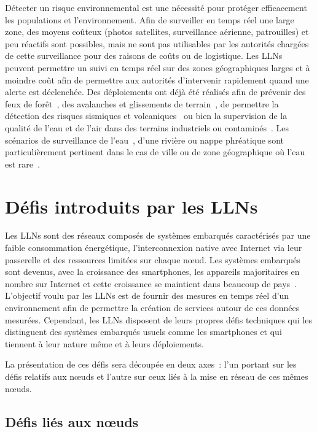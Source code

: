 Détecter un risque environnemental est une nécessité pour protéger efficacement les populations et l'environnement.
Afin de surveiller en temps réel une large zone, des moyens coûteux (photos satellites, surveillance aérienne, patrouilles) et peu réactifs sont possibles, mais ne sont pas utilisables par les autorités chargées de cette surveillance pour des raisons de coûts ou de logistique.
Les \ac{LLN}s peuvent permettre un suivi en temps réel sur des zones géographiques larges et à moindre coût afin de permettre aux autorités d'intervenir rapidement quand une alerte est déclenchée.
Des déploiements ont déjà été réalisés afin de prévenir des feux de forêt~\cite{yu2005real}, des avalanches et glissements de terrain~\cite{terzis2006slip, alippi2007adaptive}, de permettre la détection des risques sismiques et volcaniques~\cite{werner2006deploying} ou bien la supervision de la qualité de l'eau et de l'air dans des terrains industriels ou contaminés~\cite{khedo2010wireless, o2007smartcoast}.
Les scénarios de surveillance de l'eau~\cite{xiao2010smart}, d'une rivière ou nappe phréatique sont particulièrement pertinent dans le cas de ville ou de zone géographique où l'eau est rare~\cite{kerkez2012design}.

\section{Défis introduits par les \ac{LLN}s}
\label{intro:challenges}

Les \ac{LLN}s sont des réseaux composés de systèmes embarqués caractérisés par une faible consommation énergétique, l'interconnexion native avec Internet via leur passerelle et des ressources limitées sur chaque nœud.
Les systèmes embarqués sont devenus, avec la croissance des smartphones, les appareils majoritaires en nombre sur Internet et cette croissance se maintient dans beaucoup de pays~\cite{kim2007value}.
L'objectif voulu par les \ac{LLN}s est de fournir des mesures en temps réel d'un environnement afin de permettre la création de services autour de ces données mesurées.
Cependant, les \ac{LLN}s disposent de leurs propres défis techniques qui les distinguent des systèmes embarqués usuels comme les smartphones et qui tiennent à leur nature même et à leurs déploiements.

La présentation de ces défis sera découpée en deux axes~: l'un portant sur les défis relatifs aux nœuds et l'autre sur ceux liés à la mise en réseau de ces mêmes nœuds.

\subsection{Défis liés aux nœuds}

